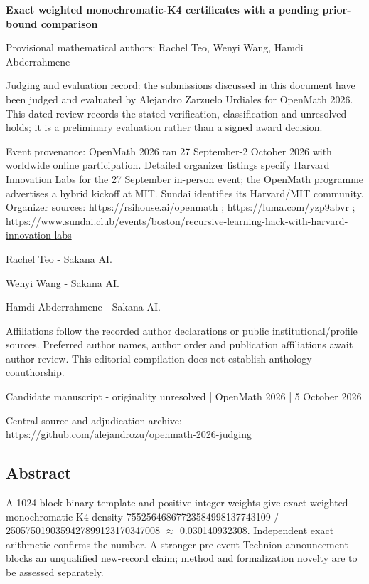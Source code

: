 \documentclass[11pt,a4paper]{article}
\begin{document}
{\LARGE\bfseries Exact weighted monochromatic-K4 certificates with a pending prior-bound comparison\par}\medskip
{\small Provisional mathematical authors: Rachel Teo, Wenyi Wang, Hamdi Abderrahmene\par}\medskip
{\small Judging and evaluation record: the submissions discussed in this document have been judged and evaluated by Alejandro Zarzuelo Urdiales for OpenMath 2026. This dated review records the stated verification, classification and unresolved holds; it is a preliminary evaluation rather than a signed award decision.\par}

{\small Event provenance: OpenMath 2026 ran 27 September-2 October 2026 with worldwide online participation. Detailed organizer listings specify Harvard Innovation Labs for the 27 September in-person event; the OpenMath programme advertises a hybrid kickoff at MIT. Sundai identifies its Harvard/MIT community. Organizer sources: \url{https://rsihouse.ai/openmath} ; \url{https://luma.com/yzp9abvr} ; \url{https://www.sundai.club/events/boston/recursive-learning-hack-with-harvard-innovation-labs}\par}

{\small Rachel Teo  -  Sakana AI.\par}

{\small Wenyi Wang  -  Sakana AI.\par}

{\small Hamdi Abderrahmene  -  Sakana AI.\par}

{\small Affiliations follow the recorded author declarations or public institutional/profile sources. Preferred author names, author order and publication affiliations await author review. This editorial compilation does not establish anthology coauthorship.\par}

{\small Candidate manuscript  -  originality unresolved | OpenMath 2026 | 5 October 2026\par}\medskip
{\small Central source and adjudication archive: \url{https://github.com/alejandrozu/openmath-2026-judging}\par}

\subsection{Abstract}
A 1024-block binary template and positive integer weights give exact weighted monochromatic-K4 density 75525646867723584998137743109 / 2505750190359427899123170347008 \ensuremath{\approx} 0.030140932308. Independent exact arithmetic confirms the number. A stronger pre-event Technion announcement blocks an unqualified new-record claim; method and formalization novelty are to be assessed separately.
\end{document}
